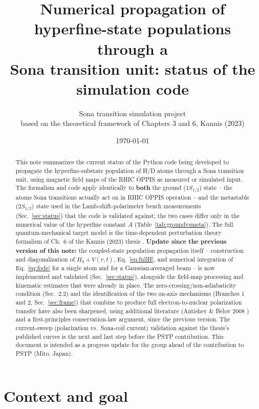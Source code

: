 \documentclass[11pt,a4paper]{article}
\title{\textbf{Numerical propagation of hyperfine-state populations through a\\
Sona transition unit: status of the simulation code}}
\author{Sona transition simulation project \\ \small based on the theoretical framework of Chapters 3 and 6, Kannis (2023)}
\date{\today}
\begin{document}
\maketitle

\begin{abstract}
\noindent
This note summarizes the current status of the Python code being developed to
propagate the hyperfine-substate population of H/D atoms through a Sona
transition unit, using magnetic field maps of the RHIC OPPIS as measured or
simulated input. The formalism and code apply identically to \textbf{both}
the ground ($1S_{1/2}$) state -- the atoms Sona transitions actually act on
in RHIC OPPIS operation -- and the metastable ($2S_{1/2}$) state used in the
Lamb-shift-polarimeter bench measurements (Sec.~\ref{sec:status}) that the
code is validated against; the two cases differ only in the numerical value
of the hyperfine constant $A$ (Table~\ref{tab:groundvsmeta}). The full quantum-mechanical target model is the
time-dependent perturbation theory formalism of Ch.~6 of the Kannis (2023)
thesis \cite{kannis2023}. \textbf{Update since the previous version of this
note:} the coupled-state population propagation itself -- construction and
diagonalization of $H_0+V(r,t)$, Eq.~\eqref{eq:fullH}, and numerical
integration of Eq.~\eqref{eq:fode} for a single atom and for a
Gaussian-averaged beam -- is now implemented and validated (Sec.~\ref{sec:status}),
alongside the field-map processing and kinematic estimates that were already
in place. The zero-crossing/non-adiabaticity condition (Sec.~2.2) and the
identification of the two on-axis mechanisms (Branches 1 and 2,
Sec.~\ref{sec:frame}) that combine to produce full electron-to-nuclear
polarization transfer have also been sharpened, using additional literature
(Antishev \& Belov 2008 \cite{antishev2008}) and a first-principles
conservation-law argument, since the previous version. The current-sweep
(polarization vs.\ Sona-coil current) validation against the thesis's
published curves is the next and last step before the PSTP contribution.
This document is intended as a progress update for the group ahead of the
contribution to PSTP (Mito, Japan).
\end{abstract}

\tableofcontents

\section{Context and goal}
\end{document}
